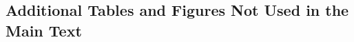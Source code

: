 \begin{appendices}
\chapter{Additional Tables and Figures Not Used in the Main Text}
\label{app:artifacts}
%
% 

%

\end{appendices}
